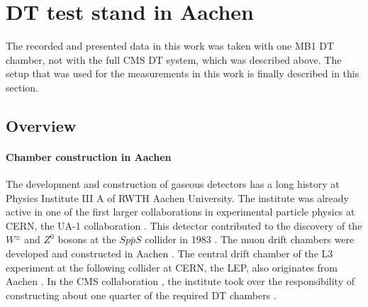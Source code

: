 \FloatBarrier
\section{DT test stand in Aachen}
\label{sec:CMS-AachenTestStand}
The recorded and presented data in this work was taken with one MB1 \ac{DT} chamber, not with the full \ac{CMS} \ac{DT} system, which was described above. The setup that was used for the measurements in this work is finally described in this section.

\subsection{Overview}
\label{sec:CMS-AachenTestStand-Overview}
\paragraph{Chamber construction in Aachen}
The development and construction of gaseous detectors has a long history at Physics Institute III A of RWTH Aachen University. The institute was already active in one of the first larger collaborations in experimental particle physics at \acs{CERN}, the UA-1 collaboration \cite{UA1-Main}. This detector contributed to the discovery of the $W^\pm$ and $Z^0$ bosons at the $Sp\bar{p}S$ collider in 1983 \cite{W-Z-Discovery}. The muon drift chambers were developed and constructed in Aachen \cite{UA1-Faissner}. The central drift chamber of the L3 experiment at the following collider at \acs{CERN}, the \ac{LEP}, also originates from Aachen \cite{L3-Main}. In the \ac{CMS} collaboration \cite{CMS-Main}, the institute took over the responsibility of constructing about one quarter of the required \ac{DT} chambers \cite{RWTH-History}.
